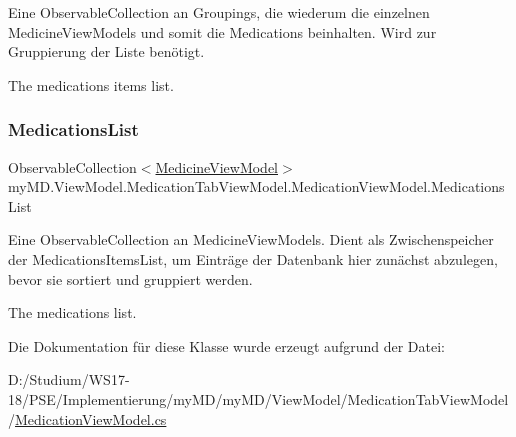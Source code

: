 Eine Observable\+Collection an Groupings, die wiederum die einzelnen Medicine\+View\+Models und somit die Medications beinhalten. Wird zur Gruppierung der Liste benötigt. 

The medications items list.\mbox{\label{classmy_m_d_1_1_view_model_1_1_medication_tab_view_model_1_1_medication_view_model_a54c6261db8bdb2a1b7bd30893223b859}} 
\subsubsection{\texorpdfstring{Medications\+List}{MedicationsList}}
{\footnotesize\ttfamily Observable\+Collection$<$\mbox{\hyperlink{classmy_m_d_1_1_view_model_1_1_medication_tab_view_model_1_1_medicine_view_model}{Medicine\+View\+Model}}$>$ my\+M\+D.\+View\+Model.\+Medication\+Tab\+View\+Model.\+Medication\+View\+Model.\+Medications\+List\hspace{0.3cm}{\ttfamily [get]}}



Eine Observable\+Collection an Medicine\+View\+Models. Dient als Zwischenspeicher der Medications\+Items\+List, um Einträge der Datenbank hier zunächst abzulegen, bevor sie sortiert und gruppiert werden. 

The medications list.

Die Dokumentation für diese Klasse wurde erzeugt aufgrund der Datei\+:\begin{DoxyCompactItemize}
\item 
D\+:/\+Studium/\+W\+S17-\/18/\+P\+S\+E/\+Implementierung/my\+M\+D/my\+M\+D/\+View\+Model/\+Medication\+Tab\+View\+Model/\mbox{\hyperlink{_medication_view_model_8cs}{Medication\+View\+Model.\+cs}}\end{DoxyCompactItemize}
